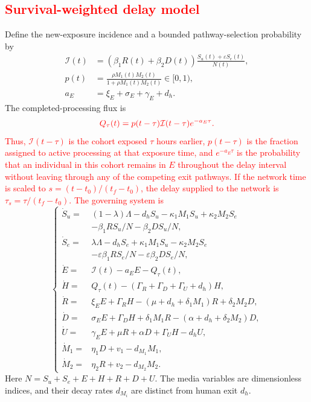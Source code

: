 \documentclass[letterpaper,journal]{IEEEtran}
\begin{document}
	\subsection{\textcolor{red}{Survival-weighted delay model}}
	Define the new-exposure incidence and a bounded pathway-selection probability by
	\begin{align}
		\mathcal I(t)&=(\beta_1R(t)+\beta_2D(t))\frac{S_u(t)+\varepsilon S_e(t)}{N(t)},\label{eq:incidence}\\
		p(t)&=\frac{\rho M_1(t)M_2(t)}{1+\rho M_1(t)M_2(t)}\in[0,1),\label{eq:path_probability}\\
		a_E&=\xi_E+\sigma_E+\gamma_E+d_h.
	\end{align}
	The completed-processing flux is
	\begin{equation}
		\textcolor{red}{Q_\tau(t)=p(t-\tau)\mathcal I(t-\tau)e^{-a_E\tau}.}
		\label{eq:cohort_flux}
	\end{equation}
	\textcolor{red}{Thus, $\mathcal I(t-\tau)$ is the cohort exposed $\tau$ hours earlier, $p(t-\tau)$ is the fraction assigned to active processing at that exposure time, and $e^{-a_E\tau}$ is the probability that an individual in this cohort remains in $E$ throughout the delay interval without leaving through any of the competing exit pathways.
	If the network time is scaled to $s=(t-t_0)/(t_f-t_0)$, the delay supplied to the network is $\tau_s=\tau/(t_f-t_0)$.}
	\textcolor{red}{The governing system is}
	\begin{equation}
		\label{equ_1}
		\left\{
		\begin{aligned}
		\dot S_u={}&(1-\lambda)\Lambda-d_hS_u-\kappa_1M_1S_u+\kappa_2M_2S_e\\
		&-\beta_1RS_u/N-\beta_2DS_u/N,\\
		\dot S_e={}&\lambda\Lambda-d_hS_e+\kappa_1M_1S_u-\kappa_2M_2S_e\\
		&-\varepsilon\beta_1RS_e/N-\varepsilon\beta_2DS_e/N,\\
		\dot E={}&\mathcal I(t)-a_EE-Q_\tau(t),\\
		\dot H={}&Q_\tau(t)-(\Gamma_R+\Gamma_D+\Gamma_U+d_h)H,\\
		\dot R={}&\xi_EE+\Gamma_RH-(\mu+d_h+\delta_1M_1)R+\delta_2M_2D,\\
		\dot D={}&\sigma_EE+\Gamma_DH+\delta_1M_1R-(\alpha+d_h+\delta_2M_2)D,\\
		\dot U={}&\gamma_EE+\mu R+\alpha D+\Gamma_UH-d_hU,\\
		\dot M_1={}&\eta_1D+v_1-d_{M_1}M_1,\\
		\dot M_2={}&\eta_2R+v_2-d_{M_2}M_2.
		\end{aligned}\right.
	\end{equation}
	Here $N=S_u+S_e+E+H+R+D+U$. The media variables are dimensionless indices, and their decay rates $d_{M_i}$ are distinct from human exit $d_h$.
\end{document}
